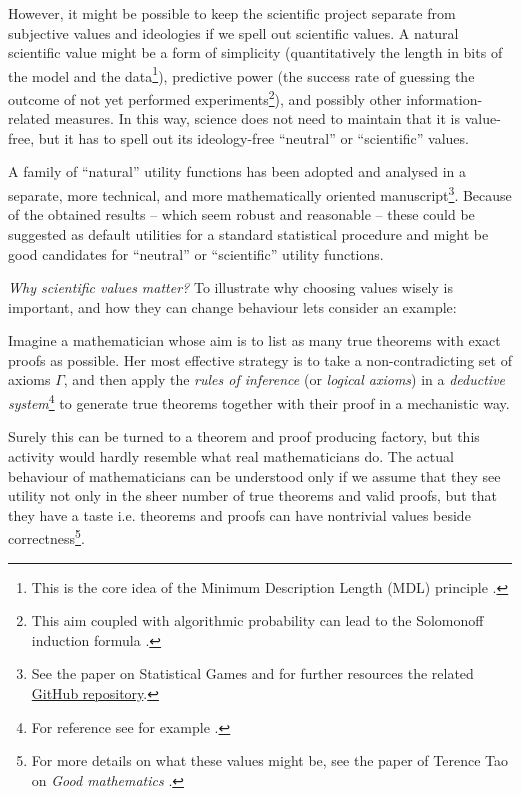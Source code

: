 \documentclass{article}
\begin{document}
However, it might be possible to keep the scientific project separate from subjective values and ideologies if we spell out scientific values. A natural scientific value might be a form of simplicity (quantitatively the length in bits of the model and the data\footnote{This is the core idea of the Minimum Description Length (MDL) principle \cite{paper:MinimumDescriptionLengthRevisited,book:MinimumDescriptionLength}.}), predictive power (the success rate of guessing the outcome of not yet performed experiments\footnote{This aim coupled with algorithmic probability \cite{book:LiVitanyi} can lead to the Solomonoff induction formula \cite{book:Solomonoff,book:UniversalArtificialIntelligence}.}), and possibly other information-related measures. In this way, science does not need to maintain that it is value-free, but it has to spell out its ideology-free ``neutral'' or ``scientific'' values.

A family of ``natural'' utility functions has been adopted and analysed in a separate, more technical, and more mathematically oriented manuscript\footnote{See the paper on Statistical Games \cite{arxiv:konczer2024statisticalgames} and for further resources the related \href{https://github.com/Konczer/UncertaintyTheory/tree/main/StatisticalGames}{GitHub repository}.}. Because of the obtained results – which seem robust and reasonable – these could be suggested as default utilities for a standard statistical procedure and might be good candidates for ``neutral'' or ``scientific'' utility functions.

{\it Why scientific values matter?}
To illustrate why choosing values wisely is important, and how they can change behaviour lets consider an example:

Imagine a mathematician whose aim is to list as many true theorems with exact proofs as possible. Her most effective strategy is to take a non-contradicting set of axioms $\Gamma$, and then apply the \emph{rules of inference} (or \emph{logical axioms}) in a \emph{deductive system}\footnote{For reference see for example \cite{sep:ClassicalLogic,book:MathematicalLogic,book:ComputabilityAndLogic}.} to generate true theorems together with their proof in a mechanistic way. 

Surely this can be turned to a theorem and proof producing factory, but this activity would hardly resemble what real mathematicians do. The actual behaviour of mathematicians can be understood only if we assume that they see utility not only in the sheer number of true theorems and valid proofs, but that they have a taste i.e. theorems and proofs can have nontrivial values beside correctness\footnote{For more details on what these values might be, see the paper of Terence Tao on \emph{Good mathematics} \cite{arxiv:GoodMathematics}.}.
\end{document}
